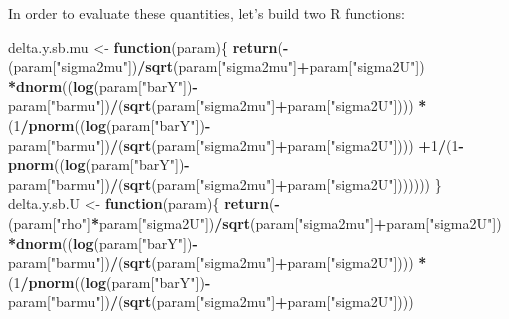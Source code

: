 \documentclass[]{book}
\newenvironment{Shaded}{\begin{snugshade}}{\end{snugshade}}
\newcommand{\KeywordTok}[1]{\textcolor[rgb]{0.13,0.29,0.53}{\textbf{#1}}}
\newcommand{\DecValTok}[1]{\textcolor[rgb]{0.00,0.00,0.81}{#1}}
\newcommand{\StringTok}[1]{\textcolor[rgb]{0.31,0.60,0.02}{#1}}
\newcommand{\ControlFlowTok}[1]{\textcolor[rgb]{0.13,0.29,0.53}{\textbf{#1}}}
\newcommand{\OperatorTok}[1]{\textcolor[rgb]{0.81,0.36,0.00}{\textbf{#1}}}
\newcommand{\NormalTok}[1]{#1}
\theoremstyle{definition}
\theoremstyle{definition}
\theoremstyle{definition}
\theoremstyle{remark}
\begin{document}
In order to evaluate these quantities, let's build two R functions:

\begin{Shaded}
\begin{Highlighting}[]
\NormalTok{delta.y.sb.mu <-}\StringTok{ }\ControlFlowTok{function}\NormalTok{(param)\{}
  \KeywordTok{return}\NormalTok{(}\OperatorTok{-}\NormalTok{(param[}\StringTok{"sigma2mu"}\NormalTok{])}\OperatorTok{/}\KeywordTok{sqrt}\NormalTok{(param[}\StringTok{"sigma2mu"}\NormalTok{]}\OperatorTok{+}\NormalTok{param[}\StringTok{"sigma2U"}\NormalTok{])}
         \OperatorTok{*}\KeywordTok{dnorm}\NormalTok{((}\KeywordTok{log}\NormalTok{(param[}\StringTok{"barY"}\NormalTok{])}\OperatorTok{-}\NormalTok{param[}\StringTok{"barmu"}\NormalTok{])}\OperatorTok{/}\NormalTok{(}\KeywordTok{sqrt}\NormalTok{(param[}\StringTok{"sigma2mu"}\NormalTok{]}\OperatorTok{+}\NormalTok{param[}\StringTok{"sigma2U"}\NormalTok{])))}
         \OperatorTok{*}\NormalTok{(}\DecValTok{1}\OperatorTok{/}\KeywordTok{pnorm}\NormalTok{((}\KeywordTok{log}\NormalTok{(param[}\StringTok{"barY"}\NormalTok{])}\OperatorTok{-}\NormalTok{param[}\StringTok{"barmu"}\NormalTok{])}\OperatorTok{/}\NormalTok{(}\KeywordTok{sqrt}\NormalTok{(param[}\StringTok{"sigma2mu"}\NormalTok{]}\OperatorTok{+}\NormalTok{param[}\StringTok{"sigma2U"}\NormalTok{])))}
           \OperatorTok{+}\DecValTok{1}\OperatorTok{/}\NormalTok{(}\DecValTok{1}\OperatorTok{-}\KeywordTok{pnorm}\NormalTok{((}\KeywordTok{log}\NormalTok{(param[}\StringTok{"barY"}\NormalTok{])}\OperatorTok{-}\NormalTok{param[}\StringTok{"barmu"}\NormalTok{])}\OperatorTok{/}\NormalTok{(}\KeywordTok{sqrt}\NormalTok{(param[}\StringTok{"sigma2mu"}\NormalTok{]}\OperatorTok{+}\NormalTok{param[}\StringTok{"sigma2U"}\NormalTok{]))))))}
\NormalTok{\}}
\NormalTok{delta.y.sb.U <-}\StringTok{ }\ControlFlowTok{function}\NormalTok{(param)\{}
  \KeywordTok{return}\NormalTok{(}\OperatorTok{-}\NormalTok{(param[}\StringTok{"rho"}\NormalTok{]}\OperatorTok{*}\NormalTok{param[}\StringTok{"sigma2U"}\NormalTok{])}\OperatorTok{/}\KeywordTok{sqrt}\NormalTok{(param[}\StringTok{"sigma2mu"}\NormalTok{]}\OperatorTok{+}\NormalTok{param[}\StringTok{"sigma2U"}\NormalTok{])}
         \OperatorTok{*}\KeywordTok{dnorm}\NormalTok{((}\KeywordTok{log}\NormalTok{(param[}\StringTok{"barY"}\NormalTok{])}\OperatorTok{-}\NormalTok{param[}\StringTok{"barmu"}\NormalTok{])}\OperatorTok{/}\NormalTok{(}\KeywordTok{sqrt}\NormalTok{(param[}\StringTok{"sigma2mu"}\NormalTok{]}\OperatorTok{+}\NormalTok{param[}\StringTok{"sigma2U"}\NormalTok{])))}
         \OperatorTok{*}\NormalTok{(}\DecValTok{1}\OperatorTok{/}\KeywordTok{pnorm}\NormalTok{((}\KeywordTok{log}\NormalTok{(param[}\StringTok{"barY"}\NormalTok{])}\OperatorTok{-}\NormalTok{param[}\StringTok{"barmu"}\NormalTok{])}\OperatorTok{/}\NormalTok{(}\KeywordTok{sqrt}\NormalTok{(param[}\StringTok{"sigma2mu"}\NormalTok{]}\OperatorTok{+}\NormalTok{param[}\StringTok{"sigma2U"}\NormalTok{])))}

\end{Highlighting}
\end{Shaded}
\end{document}
